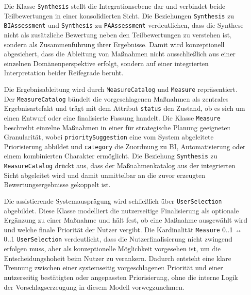 Die Klasse \texttt{Synthesis} stellt die Integrationsebene dar und verbindet beide Teilbewertungen in einer konsolidierten Sicht. Die Beziehungen \texttt{Synthesis} zu \texttt{BIAssessment} und \texttt{Synthesis} zu \texttt{PAAssessment} verdeutlichen, dass die Synthese nicht als zusätzliche Bewertung neben den Teilbewertungen zu verstehen ist, sondern als Zusammenführung ihrer Ergebnisse. Damit wird konzeptionell abgesichert, dass die Ableitung von Maßnahmen nicht ausschließlich aus einer einzelnen Domänenperspektive erfolgt, sondern auf einer integrierten Interpretation beider Reifegrade beruht.

Die Ergebnisableitung wird durch \texttt{MeasureCatalog} und \texttt{Measure} repräsentiert. Der \texttt{MeasureCatalog} bündelt die vorgeschlagenen Maßnahmen als zentrales Ergebnisartefakt und trägt mit dem Attribut \texttt{status} den Zustand, ob es sich um einen Entwurf oder eine finalisierte Fassung handelt. Die Klasse \texttt{Measure} beschreibt einzelne Maßnahmen in einer für strategische Planung geeigneten Granularität, wobei \texttt{prioritySuggestion} eine vom System abgeleitete Priorisierung abbildet und \texttt{category} die Zuordnung zu BI, Automatisierung oder einem kombinierten Charakter ermöglicht. Die Beziehung \texttt{Synthesis} zu \texttt{MeasureCatalog} drückt aus, dass der Maßnahmenkatalog aus der integrierten Sicht abgeleitet wird und damit unmittelbar an die zuvor erzeugten Bewertungsergebnisse gekoppelt ist.

Die assistierende Systemausprägung wird schließlich über \texttt{UserSelection} abgebildet. Diese Klasse modelliert die nutzerseitige Finalisierung als optionale Ergänzung zu einer Maßnahme und hält fest, ob eine Maßnahme ausgewählt wird und welche finale Priorität der Nutzer vergibt. Die Kardinalität \texttt{Measure} 0..1 ↔ 0..1 \texttt{UserSelection} verdeutlicht, dass die Nutzerfinalisierung nicht zwingend erfolgen muss, aber als konzeptionelle Möglichkeit vorgesehen ist, um die Entscheidungshoheit beim Nutzer zu verankern. Dadurch entsteht eine klare Trennung zwischen einer systemseitig vorgeschlagenen Priorität und einer nutzerseitig bestätigten oder angepassten Priorisierung, ohne die interne Logik der Vorschlagserzeugung in diesem Modell vorwegzunehmen.


